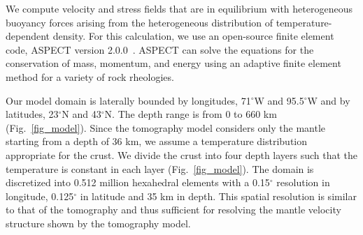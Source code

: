 \documentclass[draft,linenumbers]{agujournal2018}
\begin{document}
    We compute velocity and stress fields that are in equilibrium with heterogeneous buoyancy forces arising from the heterogeneous distribution of temperature-dependent density. For this calculation, we use an open-source finite element code, ASPECT version 2.0.0~\citep{heister_aspect_methods2,KHB12,aspect-doi-v2.0.0}. ASPECT can solve the equations for the conservation of mass, momentum, and energy using an adaptive finite element method for a variety of rock rheologies. 
    
     Our model domain is laterally bounded by longitudes, 71$^{\circ}$W and 95.5$^{\circ}$W and by latitudes, 23$^{\circ}$N and 43$^{\circ}$N. The depth range is from 0 to 660 km (Fig.~\ref{fig_model}). Since the tomography model considers only the mantle starting from a depth of 36 km, we assume a temperature distribution appropriate for the crust. We divide the crust into four depth layers such that the temperature is constant in each layer (Fig.~\ref{fig_model}). The domain is discretized into 0.512 million hexahedral elements with a 0.15$^{\circ}$ resolution in longitude, 0.125$^{\circ}$ in latitude and 35 km in depth. This spatial resolution is similar to that of the tomography and thus sufficient for resolving the mantle velocity structure shown by the tomography model. 
\end{document}
